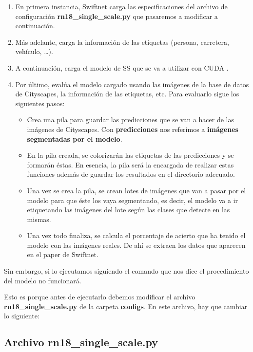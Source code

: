 \begin{enumerate}
\item En primera instancia, Swiftnet carga las especificaciones del archivo de configuración \textbf{rn18\_single\_scale.py} que pasaremos a modificar a continuación.
\item Más adelante, carga la información de las etiquetas (persona, carretera, vehículo, \ldots).
\item A continuación, carga el modelo de \ac{SS} que se va a utilizar con CUDA \cite{cuda}.
\item Por último, evalúa el modelo cargado usando las imágenes de la base de datos de Cityscapes, la información de las etiquetas, etc. Para evaluarlo sigue los siguientes pasos:

\begin{itemize}
\item Crea una pila para guardar las predicciones que se van a hacer de las imágenes de Cityscapes. Con \textbf{predicciones} nos referimos a \textbf{imágenes segmentadas por el modelo}.
\item En la pila creada, se colorizarán las etiquetas de las predicciones y se formarán éstas. En esencia, la pila será la encargada de realizar estas funciones además de guardar los resultados en el directorio adecuado.
\item Una vez se crea la pila, se crean lotes de imágenes que van a pasar por el modelo para que éste los vaya segmentando, es decir, el modelo va a ir etiquetando las imágenes del lote según las clases que detecte en las mismas.
\item Una vez todo finaliza, se calcula el porcentaje de acierto que ha tenido el modelo con las imágenes reales. De ahí se extraen los datos que aparecen en el paper de Swiftnet.
\end{itemize}   
\end{enumerate}
Sin embargo, si lo ejecutamos siguiendo el comando que nos dice el procedimiento del modelo no funcionará.

Esto es porque antes de ejecutarlo debemos modificar el archivo \textbf{rn18\_single\_scale.py} de la carpeta \textbf{configs}. En este archivo, hay que cambiar lo siguiente:

\subsection{Archivo rn18\_single\_scale.py}

